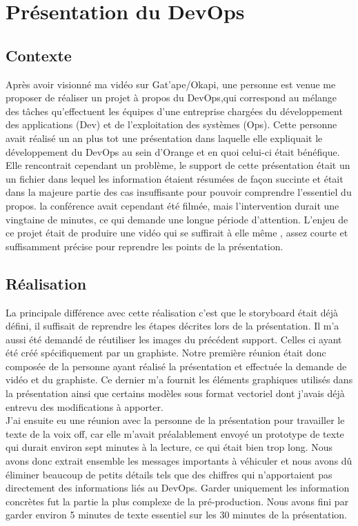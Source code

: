 \section{Présentation du DevOps}


\subsection{Contexte}

Après avoir visionné ma vidéo sur Gat'ape/Okapi, une personne est venue me proposer de réaliser un projet à propos du DevOps,qui correspond au mélange des tâches qu'effectuent les équipes d'une entreprise chargées du développement des applications (Dev) et de l'exploitation des systèmes (Ops). Cette personne avait réalisé un an plus tot une présentation dans laquelle elle expliquait le développement du DevOps au sein d'Orange et en quoi celui-ci était bénéfique. Elle rencontrait cependant un problème, le support de cette présentation était un un fichier dans lequel les information étaient résumées de façon succinte et était  dans la majeure partie des cas insuffisante pour pouvoir comprendre l'essentiel du propos. la conférence avait cependant été filmée, mais l'intervention durait une vingtaine de minutes, ce qui demande une longue période d'attention. L'enjeu de ce projet était de produire une vidéo qui se suffirait à elle même , assez courte et suffisamment précise pour reprendre les points de la présentation.


\subsection{Réalisation}
La principale différence avec cette réalisation c'est que le storyboard était déjà défini, il suffisait de reprendre les étapes décrites lors de la présentation. Il m'a aussi été demandé de réutiliser les images du précédent support. Celles ci ayant été créé spécifiquement par un graphiste. Notre première réunion était donc composée de la personne ayant réalisé la présentation et effectuée la demande de vidéo et du graphiste. Ce dernier m'a fournit les éléments graphiques utilisés dans la présentation ainsi que certains modèles sous format vectoriel dont j'avais déjà entrevu des modifications à apporter.\\

J'ai ensuite eu une réunion avec la personne de la présentation pour travailler le texte de la voix off, car elle m'avait préalablement envoyé un prototype de texte qui durait environ sept minutes à la lecture, ce qui était bien trop long. Nous avons donc extrait ensemble les messages importants à véhiculer et nous avons dû éliminer beaucoup de petits détails tels que des chiffres qui n'apportaient pas directement des informations liés au DevOps. Garder uniquement les information concrètes fut la partie la plus complexe de la pré-production. Nous avons fini par garder environ 5 minutes de texte essentiel sur les 30 minutes de la présentation.\\

